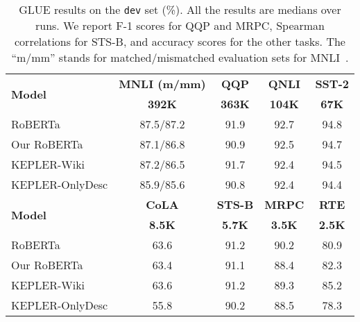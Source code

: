 \begin{table}[t]
    \centering
    \tablefont
    \begin{adjustbox}{max width=0.98\linewidth}
    \begin{tabular}{lcccc}
        \toprule
        \multirow{2}{*}{\textbf{Model}} & \textbf{MNLI (m/mm)} & \textbf{QQP} &  \textbf{QNLI}  & \textbf{SST-2} \\
              & {\scriptsize \textbf{392K}} & {\scriptsize \textbf{363K}} & {\scriptsize \textbf{104K}} & {\scriptsize \textbf{67K}}\\
        \midrule
        RoBERTa & 87.5/87.2 &  91.9 & 92.7 & 94.8\\
        Our RoBERTa & 87.1/86.8 & 90.9 & 92.5 & 94.7 \\
        KEPLER-Wiki & 87.2/86.5  & 91.7 & 92.4 & 94.5\\
        KEPLER-OnlyDesc & 85.9/85.6  & 90.8 & 92.4 & 94.4\\
        \bottomrule
        \toprule
        \multirow{2}{*}{\textbf{Model}} &  \textbf{CoLA} & \textbf{STS-B} & \textbf{MRPC} & \textbf{RTE} \\
              & {\scriptsize \textbf{8.5K}} & {\scriptsize \textbf{5.7K}} & {\scriptsize \textbf{3.5K}} & {\scriptsize \textbf{2.5K}}  \\
        \midrule
        RoBERTa &   63.6 & 91.2   & 90.2 & 80.9\\
        Our RoBERTa &  63.4 & 91.1  & 88.4 & 82.3\\
        KEPLER-Wiki &  63.6 & 91.2 & 89.3 & 85.2  \\
        KEPLER-OnlyDesc & 55.8 & 90.2 & 88.5 & 78.3\\
        \bottomrule
    \end{tabular}
    \end{adjustbox}
    
    \caption{GLUE results on the \texttt{dev} set (\%). All the results are medians over  runs. We report F-1 scores for QQP and MRPC, Spearman correlations for STS-B, and accuracy scores for the other tasks. The ``m/mm'' stands for matched/mismatched evaluation sets for MNLI~\citep{N18-1101}.} \label{tab:glue}
\end{table}


